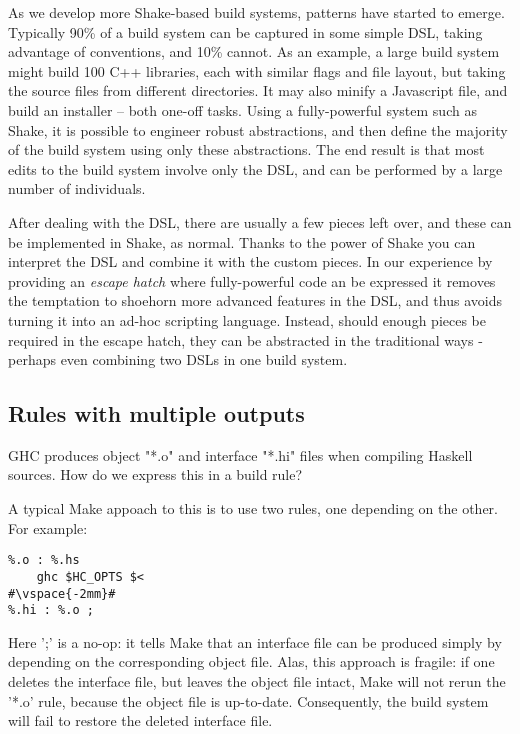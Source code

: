 As we develop more Shake-based build systems, patterns have started to emerge.
Typically 90\% of a build system can be captured in some simple DSL, taking
advantage of conventions, and 10\% cannot. As an example, a large build system
might build 100 C++ libraries, each with similar flags and file layout, but
taking the source files from different directories. It may also minify a
Javascript file, and build an installer -- both one-off tasks. Using a
fully-powerful system such as Shake, it is possible to engineer robust
abstractions, and then define the majority of the build system using only these
abstractions. The end result is that most edits to the build system involve only
the DSL, and can be performed by a large number of individuals.

After dealing with the DSL, there are usually a few pieces left over, and these
can be implemented in Shake, as normal. Thanks to the power of Shake you can
interpret the DSL and combine it with the custom pieces. In our experience by
providing an \emph{escape hatch} where fully-powerful code an be expressed it
removes the temptation to shoehorn more advanced features in the DSL, and thus
avoids turning it into an ad-hoc scripting language. Instead, should enough
pieces be required in the escape hatch, they can be abstracted in the
traditional ways - perhaps even combining two DSLs in one build system.

\subsection{Rules with multiple outputs\label{sec:multiple-outputs}}

GHC produces object \lst"*.o" and interface \lst"*.hi" files when compiling
Haskell sources. How do we express this in a build rule?

A typical Make appoach to this is to use two rules, one depending on the other.
For example:

\begin{lstlisting}
%.o : %.hs
    ghc $HC_OPTS $<
#\vspace{-2mm}#
%.hi : %.o ;
\end{lstlisting}
\noindent Here \lst';' is a no-op: it tells Make that an interface file can be
produced simply by depending on the corresponding object file. Alas, this
approach is fragile: if one deletes the interface file, but leaves the object
file intact, Make will not rerun the \lst'*.o' rule, because the object file is
up-to-date. Consequently, the build system will fail to restore the deleted
interface file.

